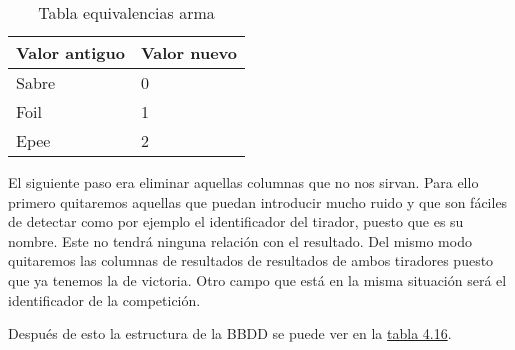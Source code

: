 \begin{table}[]
  \centering
  \caption{Tabla equivalencias arma}
  \label{tab:Tabla equivalencias arma}
  \begin{tabular}{|ll|}
    \hline
    \rowcolor[HTML]{C0C0C0}
    Valor antiguo & Valor nuevo \\ \hline
    Sabre & 0 \\ \hline
    Foil & 1 \\ \hline
    Epee & 2 \\ \hline
  \end{tabular}
\end{table}

El siguiente paso era eliminar aquellas columnas que no nos sirvan. Para ello
primero quitaremos aquellas que puedan introducir mucho ruido y que son fáciles
de detectar como por ejemplo el identificador del tirador, puesto que es su nombre.
Este no tendrá ninguna relación con el resultado. Del mismo modo quitaremos las columnas
de resultados de resultados de ambos tiradores puesto que ya tenemos la de victoria.
Otro campo que está en la misma situación será el identificador de la competición.

Después de esto la estructura de la \acs {BBDD} se puede ver en la \hyperref[tab:Estructura BBDD final postproceso]{tabla 4.16}.


